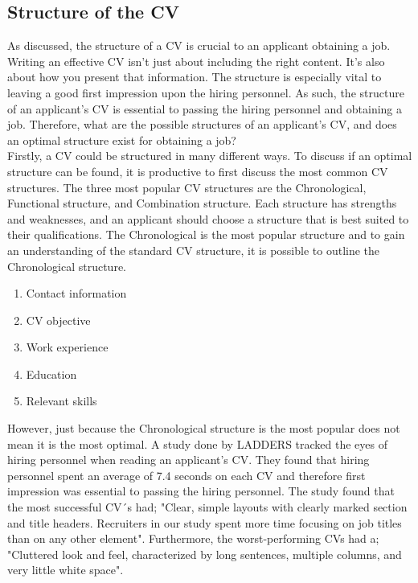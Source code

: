 \subsection{Structure of the CV} \label{Structure of the CV}
As discussed, the structure of a CV is crucial to an applicant obtaining a job.
Writing an effective CV isn't just about including the right content. 
It's also about how you present that information.
The structure is especially vital to leaving a good first impression upon the hiring personnel.
As such, the structure of an applicant's CV is essential to passing the hiring personnel and obtaining a job.
Therefore, what are the possible structures of an applicant's CV, and does an optimal structure exist for obtaining a job? \\

Firstly, a CV could be structured in many different ways.
To discuss if an optimal structure can be found, it is productive to first discuss the most common CV structures.
The three most popular CV structures are the Chronological, Functional structure, and Combination structure. \cite{Tips_for_best_format}
Each structure has strengths and weaknesses, and an applicant should choose a structure that is best suited to their qualifications.
The Chronological is the most popular structure and to gain an understanding of the standard CV structure, it is possible to outline the Chronological structure.
\begin{enumerate}
   \item  Contact information
   \item  CV objective
   \item  Work experience
   \item  Education
   \item  Relevant skills \\
\end{enumerate}
However, just because the Chronological structure is the most popular does not mean it is the most optimal. 
A study done by LADDERS tracked the eyes of hiring personnel when reading an applicant's CV. \cite{Eye_Tracking_Study}
They found that hiring personnel spent an average of 7.4 seconds on each CV and therefore first impression was essential to passing the hiring personnel. 
The study found that the most successful CV´s had; "Clear, simple layouts with clearly marked section and title headers. Recruiters in our study spent more time focusing on job titles than on any other element". \cite{Eye_Tracking_Study}
Furthermore, the worst-performing CVs had a; "Cluttered look and feel, characterized by long sentences, multiple columns, and very little white space". \cite{Eye_Tracking_Study}
